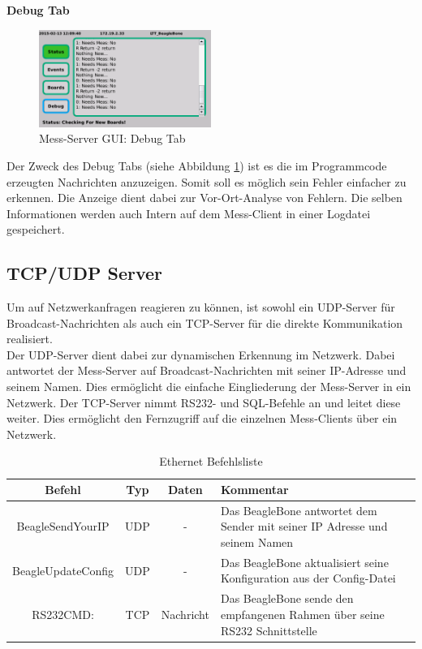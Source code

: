 \textbf{Debug Tab}

\begin{figure}[H]
\begin{center}
\includegraphics[width=0.5\textwidth ]{img/GUI/Server_GUI_Debug2.png}
\caption{Mess-Server GUI: Debug Tab}
\label{figure_MessServerGUIDebug}
\end{center}
\end{figure}

Der Zweck des Debug Tabs (siehe Abbildung \ref{figure_MessServerGUIDebug}) ist es die im Programmcode erzeugten Nachrichten anzuzeigen. Somit soll es möglich sein Fehler einfacher zu erkennen. Die Anzeige dient dabei zur Vor-Ort-Analyse von Fehlern. Die selben Informationen werden auch Intern auf dem Mess-Client in einer Logdatei gespeichert.


\subsection{TCP/UDP Server}
\label{section_TCPUDPServer}
Um auf Netzwerkanfragen reagieren zu können, ist sowohl ein UDP-Server für Broadcast-Nachrichten als auch ein TCP-Server für die direkte Kommunikation realisiert.\\
Der UDP-Server dient dabei zur dynamischen Erkennung im Netzwerk. Dabei antwortet der Mess-Server auf Broadcast-Nachrichten mit seiner IP-Adresse und seinem Namen. Dies ermöglicht die einfache Eingliederung der Mess-Server in ein Netzwerk.
Der TCP-Server nimmt RS232- und SQL-Befehle an und leitet diese weiter. Dies ermöglicht den Fernzugriff auf die einzelnen Mess-Clients über ein Netzwerk.\\

\begin{table}[H]
\begin{center}
\begin{tabularx}{\textwidth}{|c|c|c|X|}\hline 
 Befehl & Typ & Daten & Kommentar \\ \hline
 BeagleSendYourIP & UDP & - & Das BeagleBone antwortet dem Sender mit seiner IP Adresse und seinem Namen  \\ \hline
 BeagleUpdateConfig & UDP & - & Das BeagleBone aktualisiert seine Konfiguration aus der Config-Datei \\ \hline
 RS232CMD: & TCP & Nachricht & Das BeagleBone sende den empfangenen Rahmen über seine RS232 Schnittstelle \\ \hline
\end{tabularx}
\caption{Ethernet Befehlsliste}
\label{table_EthernetCommands}
\end{center}
\end{table}

